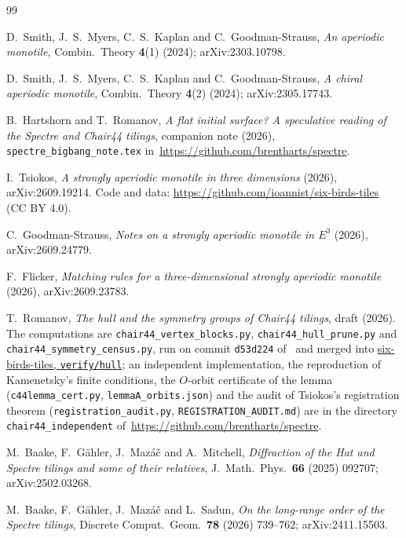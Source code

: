 \documentclass[11pt]{article}
\theoremstyle{definition}
\theoremstyle{remark}
\newcommand{\code}[1]{\texttt{#1}}
\begin{document}
\begin{thebibliography}{99}

 D.~Smith, J.~S.~Myers, C.~S.~Kaplan and C.~Goodman-Strauss, \emph{An aperiodic monotile},
Combin.\ Theory \textbf{4}(1) (2024); arXiv:2303.10798.

 D.~Smith, J.~S.~Myers, C.~S.~Kaplan and C.~Goodman-Strauss, \emph{A chiral aperiodic monotile},
Combin.\ Theory \textbf{4}(2) (2024); arXiv:2305.17743.


 B.~Hartshorn and T.~Romanov, \emph{A flat initial surface? A speculative reading of the Spectre and
Chair44 tilings}, companion note (2026), \code{spectre\_bigbang\_note.tex} in~\url{https://github.com/brentharts/spectre}.

 I.~Tsiokos, \emph{A strongly aperiodic monotile in three dimensions} (2026),
arXiv:2609.19214.  Code and data:
\url{https://github.com/ioannist/six-birds-tiles} (CC BY 4.0).

 C.~Goodman-Strauss, \emph{Notes on a strongly aperiodic monotile in $E^{3}$} (2026),
arXiv:2609.24779.

 F.~Flicker, \emph{Matching rules for a three-dimensional strongly aperiodic monotile} (2026),
arXiv:2609.23783.

 T.~Romanov, \emph{The hull and the symmetry groups of Chair44 tilings}, draft (2026).  The
computations are \code{chair44\_vertex\_blocks.py}, \code{chair44\_hull\_prune.py} and \code{chair44\_symmetry\_census.py},
run on commit \code{d53d224} of~\cite{Tsiokos1} and merged into
\href{https://github.com/brentharts/six-birds-tiles/tree/main/verify/hull}{six-birds-tiles, \code{verify/hull}}; an independent
implementation, the reproduction of Kamenetsky's finite conditions, the $O$-orbit certificate of the lemma
(\code{c44lemma\_cert.py}, \code{lemmaA\_orbits.json}) and the audit of Tsiokos's registration theorem
(\code{registration\_audit.py}, \code{REGISTRATION\_AUDIT.md}) are in the directory \code{chair44\_independent} of~\url{https://github.com/brentharts/spectre}.

 M.~Baake, F.~G\"ahler, J.~Mazá\v{c} and A.~Mitchell, \emph{Diffraction of the Hat and Spectre tilings
and some of their relatives}, J.\ Math.\ Phys.\ \textbf{66} (2025) 092707; arXiv:2502.03268.

 M.~Baake, F.~G\"ahler, J.~Mazá\v{c} and L.~Sadun, \emph{On the long-range order of the Spectre
tilings}, Discrete Comput.\ Geom.\ \textbf{78} (2026) 739--762; arXiv:2411.15503.


\end{thebibliography}
\end{document}
